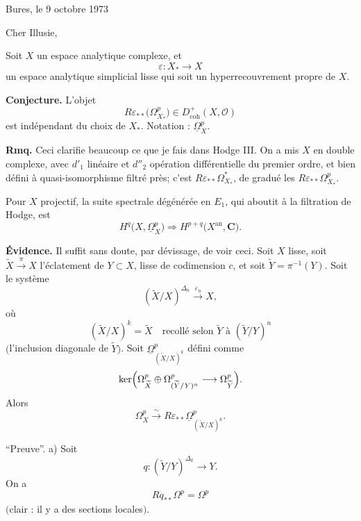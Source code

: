 \documentclass[11pt]{article}
\newcommand{\OO}{\mathcal O}
\newcommand{\CC}{\mathbf C}
\newcommand{\uOmega}{\underline{\Omega}}
\newcommand{\eps}{\varepsilon}
\newcommand{\coh}{\mathrm{coh}}
\begin{document}
\thispagestyle{empty}

\noindent\hfill Bures, le 9 octobre 1973

\vspace{1.1em}

Cher Illusie,

Soit \(X\) un espace analytique complexe, et
\[
\eps\colon X_\ast\longrightarrow X
\]
un espace analytique simplicial lisse qui soit un hyperrecouvrement propre de \(X\).

\textbf{Conjecture.} L'objet
\[
R\eps_{\ast\ast}\bigl(\Omega^p_{X_\ast}\bigr)\in D^+_{\coh}(X,\OO)
\]
est indépendant du choix de \(X_\ast\). Notation : \(\uOmega^p_X\).

\textbf{Rmq.} Ceci clarifie beaucoup ce que je fais dans Hodge III. On a mis \(X\) en double complexe, avec \(d'_1\) linéaire et \(d''_2\) opération différentielle du premier ordre, et bien défini à quasi-isomorphisme filtré près; c'est \(R\eps_{\ast\ast}\Omega^\ast_{X_\ast}\), de gradué les \(R\eps_{\ast\ast}\Omega^p_{X_\ast}\).

Pour \(X\) projectif, la suite spectrale dégénérée en \(E_1\), qui aboutit à la filtration de Hodge, est
\[
H^q\bigl(X,\uOmega^p_X\bigr)\Longrightarrow H^{p+q}\bigl(X^{\mathrm{an}},\CC\bigr).
\]

\textbf{Évidence.} Il suffit sans doute, par dévissage, de voir ceci. Soit \(X\) lisse, soit
\(\widetilde X\xrightarrow{\pi}X\) l'éclatement de \(Y\subset X\), lisse de codimension \(c\), et soit \(\widetilde Y=\pi^{-1}(Y)\). Soit le système
\[
(\widetilde X/X)^{\Delta_n}\xrightarrow{\eps_n}X,
\]
où
\[
(\widetilde X/X)^k=\widetilde X\quad\text{recollé selon }\widetilde Y
\text{ à }(\widetilde Y/Y)^n
\]
\(\bigl(\)l'inclusion diagonale de \(\widetilde Y\)\(\bigr)\). Soit
\(\uOmega^p_{(\widetilde X/X)^k}\) défini comme
\[
\ker\Bigl(\Omega^p_{\widetilde X}\oplus
\Omega^p_{(\widetilde Y/Y)^n}\longrightarrow \Omega^p_{\widetilde Y}\Bigr).
\]
Alors
\[
\Omega^p_X\xrightarrow{\sim}
R\eps_{\ast\ast}\uOmega^p_{(\widetilde X/X)^k}.
\]

``Preuve''. a) Soit
\[
q\colon (\widetilde Y/Y)^{\Delta_k}\longrightarrow Y.
\]
On a
\[
Rq_{\ast\ast}\Omega^p=\Omega^p
\]
\(\bigl(\)clair : il y a des sections locales\(\bigr)\).
\end{document}
